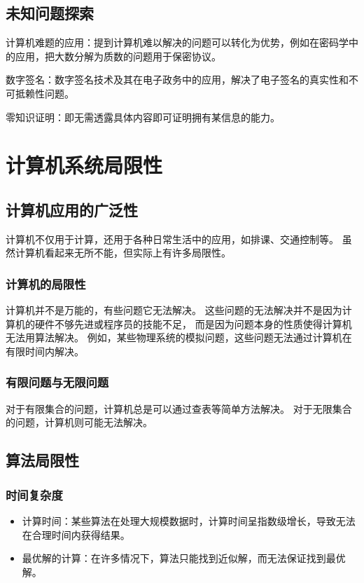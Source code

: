 \documentclass[UTF-8,a4paper,9pt]{article}
\begin{document}
\subsection{未知问题探索}

计算机难题的应用：提到计算机难以解决的问题可以转化为优势，例如在密码学中的应用，把大数分解为质数的问题用于保密协议。

数字签名：数字签名技术及其在电子政务中的应用，解决了电子签名的真实性和不可抵赖性问题。

零知识证明：即无需透露具体内容即可证明拥有某信息的能力。

\section{计算机系统局限性}

\subsection{计算机应用的广泛性}
计算机不仅用于计算，还用于各种日常生活中的应用，如排课、交通控制等。
虽然计算机看起来无所不能，但实际上有许多局限性。

\subsubsection{计算机的局限性}
计算机并不是万能的，有些问题它无法解决。
这些问题的无法解决并不是因为计算机的硬件不够先进或程序员的技能不足，
而是因为问题本身的性质使得计算机无法用算法解决。
例如，某些物理系统的模拟问题，这些问题无法通过计算机在有限时间内解决。

\subsubsection{有限问题与无限问题}
对于有限集合的问题，计算机总是可以通过查表等简单方法解决。
对于无限集合的问题，计算机则可能无法解决。

\subsection{算法局限性}

\subsubsection*{时间复杂度}
\begin{itemize}
  \item 计算时间：某些算法在处理大规模数据时，计算时间呈指数级增长，导致无法在合理时间内获得结果。
  \item 最优解的计算：在许多情况下，算法只能找到近似解，而无法保证找到最优解。
\end{itemize}
\end{document}
